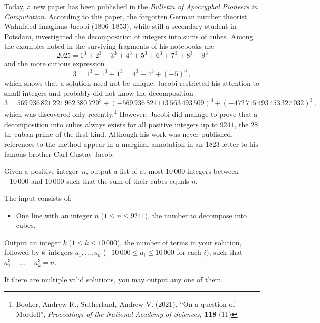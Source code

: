 

\newcommand{\maxn}{9241}
\newcommand{\maxo}{10\,000}
\newcommand{\maxx}{10\,000}

Today, a new paper has been published
in the \emph{Bulletin of Apocryphal Pioneers in Computation}.
According to this paper, the forgotten German number theorist Wahnfried Imaginus Jacobi (1806--1853), while still a secondary student in Potsdam, investigated the decomposition of integers into sums of cubes.
Among the examples noted in the surviving fragments of his notebooks are \[
    2025 = 1^3 + 2^3 + 3^3 + 4^3 + 5^3 + 6^3 + 7^3 + 8^3 + 9^3
\] and the more curious expression \[ 3 = 1^3 + 1^3 + 1^3 = 4^3 + 4^3 + (-5)^3\,,\]
which shows that a solution need not be unique.
Jacobi restricted his attention to small integers and probably did not know the decomposition {\small \[
    3 = 569\,936\,821\,221\,962\,380\,720^3 + (-569\,936\,821\,113\,563\,493\,509)^3 + (-472\,715\,493\,453\,327\,032)^3
\,,\]}%
which was discovered only recently.\footnote{Booker, Andrew R.; Sutherland, Andrew V. (2021), ``On a question of Mordell'', \emph{Proceedings of the National Academy of Sciences}, \textbf{118} (11)}
However, Jacobi did manage to prove that a decomposition into cubes always exists for all positive integers up to $9241$, the $28$th~cuban prime of the first kind.
Although his work was never published, references to the method appear in a marginal annotation in an 1823 letter to his famous brother Carl Gustav Jacob.

\medskip
Given a positive integer~$n$, output a list of at most $\maxo$ integers between $-\maxx$ and $\maxx$
such that the sum of their cubes equals $n$.

\begin{Input}
    The input consists of:
    \begin{itemize}
        \item One line with an integer $n$ ($1\leq n\leq \maxn$), the number to decompose into cubes.
    \end{itemize}
\end{Input}

\begin{Output}
    Output an integer $k$ ($1 \leq k \leq 10\,000$), the number of terms in your solution,
    followed by $k$~integers $a_1,\ldots, a_k$ ($-\maxx\leq a_i\leq\maxx$ for each $i$),
    such that $a_1^3 + \dots + a_k^3 = n$.

    If there are multiple valid solutions, you may output any one of them.
\end{Output}
